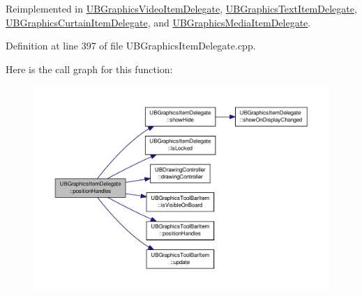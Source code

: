 Reimplemented in \hyperlink{class_u_b_graphics_video_item_delegate_aeb9b858358a46026f500f9da791f7aaf}{U\-B\-Graphics\-Video\-Item\-Delegate}, \hyperlink{class_u_b_graphics_text_item_delegate_a7ecdc3b3ed05e772714e7bb461de779f}{U\-B\-Graphics\-Text\-Item\-Delegate}, \hyperlink{class_u_b_graphics_curtain_item_delegate_a9cad3186c84745ba1aa13f879a263a58}{U\-B\-Graphics\-Curtain\-Item\-Delegate}, and \hyperlink{class_u_b_graphics_media_item_delegate_a0d2d62936d516875a60975d4f66d3dde}{U\-B\-Graphics\-Media\-Item\-Delegate}.



Definition at line 397 of file U\-B\-Graphics\-Item\-Delegate.\-cpp.



Here is the call graph for this function\-:
\nopagebreak
\begin{figure}[H]
\begin{center}
\leavevmode
\includegraphics[width=350pt]{dd/dd5/class_u_b_graphics_item_delegate_ab5bea580591d38d488f536d80278eade_cgraph}
\end{center}
\end{figure}




